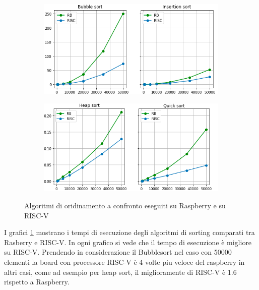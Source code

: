 \documentclass[12pt,a4paper]{report}
\begin{document}
\begin{figure}[htbp]
     \centering
     \begin{subfigure}[t]{0.49\textwidth}
         \centering
         \includegraphics[width=\textwidth]{Img/GraficiSorting/BISort_RB.png}
        
     \end{subfigure}
     \hfill
     \begin{subfigure}[t]{0.49\textwidth}
         \centering
         \includegraphics[width=\textwidth]{Img/GraficiSorting/HQSort_RB.png}
         
     \end{subfigure}

   \caption{Algoritmi di oridinamento a confronto eseguiti su Raspberry e su RISC-V}
   \label{Fig:AllSort_RB}
\end{figure}

I grafici \ref{Fig:AllSort_RB} mostrano i tempi di esecuzione degli algoritmi di sorting comparati tra Rasberry e RISC-V. In ogni grafico si vede che il tempo di esecuzione è migliore su RISC-V. Prendendo in considerazione il Bubblesort nel caso con 50000 elementi la board con processore RISC-V è 4 volte piu veloce del raspberry in altri casi, come ad esempio per heap sort, il miglioramente di RISC-V è 1.6 rispetto a Raspberry. 
\end{document}
